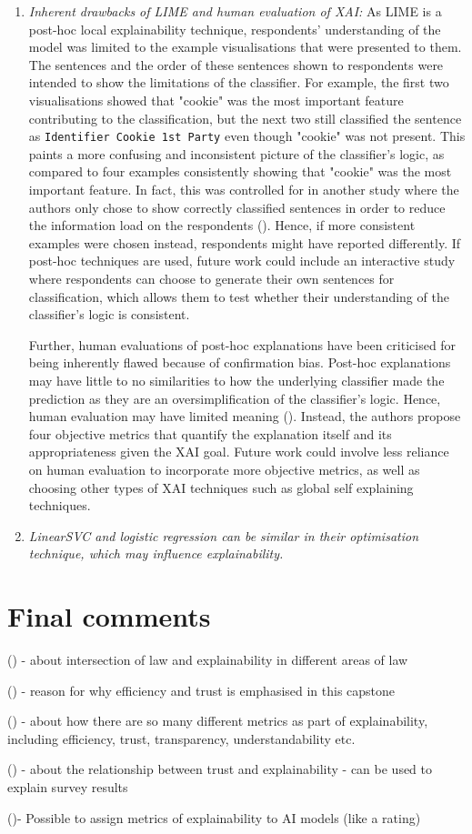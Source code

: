 \begin{enumerate}
    \item \textit{Inherent drawbacks of LIME and human evaluation of XAI:} As LIME is a post-hoc local explainability technique, respondents' understanding of the model was limited to the example visualisations that were presented to them. The sentences and the order of these sentences shown to respondents were intended to show the limitations of the classifier. For example, the first two visualisations showed that "cookie" was the most important feature contributing to the classification, but the next two still classified the sentence as \texttt{Identifier Cookie 1st Party} even though "cookie" was not present. This paints a more confusing and inconsistent picture of the classifier's logic, as compared to four examples consistently showing that "cookie" was the most important feature. In fact, this was controlled for in another study where the authors only chose to show correctly classified sentences in order to reduce the information load on the respondents (\cite{gorski2021}). Hence, if more consistent examples were chosen instead, respondents might have reported differently. If post-hoc techniques are used, future work could include an interactive study where respondents can choose to generate their own sentences for classification, which allows them to test whether their understanding of the classifier's logic is consistent.
    
    Further, human evaluations of post-hoc explanations have been criticised for being inherently flawed because of confirmation bias. Post-hoc explanations may have little to no similarities to how the underlying classifier made the prediction as they are an oversimplification of the classifier's logic. Hence, human evaluation may have limited meaning (\cite{rosenfeld2021}). Instead, the authors propose four objective metrics that quantify the explanation itself and its appropriateness given the XAI goal. Future work could involve less reliance on human evaluation to incorporate more objective metrics, as well as choosing other types of XAI techniques such as global self explaining techniques.

    \item \textit{LinearSVC and logistic regression can be similar in their optimisation technique, which may influence explainability.}
\end{enumerate}

\section{Final comments}
(\cite{hacker2022varieties}) - about intersection of law and explainability in different areas of law

(\cite{yalcin2022perceptions}) - reason for why efficiency and trust is emphasised in this capstone

(\cite{vilone2021}) - about how there are so many different metrics as part of explainability, including efficiency, trust, transparency, understandability etc.

(\cite{kastner2021}) - about the relationship between trust and explainability - can be used to explain survey results

(\cite{waltl2018})- Possible to assign metrics of explainability to AI models (like a rating)